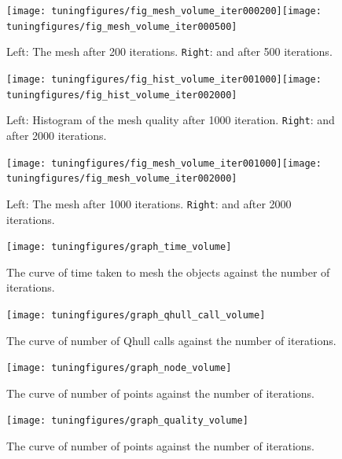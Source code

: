 \documentclass[10pt,a4paper]{book}
\begin{document}
\begin{figure}[tbhp]
\centerline{\texttt{[image: tuningfigures/fig\_mesh\_volume\_iter000200]}\hspace{3cm}\texttt{[image: tuningfigures/fig\_mesh\_volume\_iter000500]}}
\caption{\label{fig:fig_mesh_volume_iter000200} Left: The mesh after 200 iterations. \texttt{Right}: and after 500 iterations.}
\end{figure}


\begin{figure}[tbhp]
\centerline{\texttt{[image: tuningfigures/fig\_hist\_volume\_iter001000]}\hspace{3cm}\texttt{[image: tuningfigures/fig\_hist\_volume\_iter002000]}}
\caption{\label{fig:fig_hist_volume_iter001000} Left: Histogram of the mesh quality after 1000 iteration. \texttt{Right}: and after 2000 iterations.}
\end{figure}

\begin{figure}[tbhp]
\centerline{\texttt{[image: tuningfigures/fig\_mesh\_volume\_iter001000]}\hspace{3cm}\texttt{[image: tuningfigures/fig\_mesh\_volume\_iter002000]}}
\caption{\label{fig:fig_mesh_volume_iter001000} Left: The mesh after 1000 iterations. \texttt{Right}: and after 2000 iterations.}
\end{figure}


\begin{figure}[tbhp]
\centerline{\texttt{[image: tuningfigures/graph\_time\_volume]}}
\caption{\label{fig:graph_time_volume} The curve of time taken to mesh the objects against the number of iterations.}
\end{figure}

\begin{figure}[tbhp]
\centerline{\texttt{[image: tuningfigures/graph\_qhull\_call\_volume]}}
\caption{\label{fig:graph_qhull_call_volume} The curve of number of Qhull calls against the number of iterations.}
\end{figure}

\begin{figure}[tbhp]
\centerline{\texttt{[image: tuningfigures/graph\_node\_volume]}}
\caption{\label{fig:graph_node_volume} The curve of number of points against the number of iterations.}
\end{figure}

\begin{figure}[tbhp]
\centerline{\texttt{[image: tuningfigures/graph\_quality\_volume]}}
\caption{\label{fig:graph_quality_volume} The curve of number of points against the number of iterations.}
\end{figure}
\end{document}
